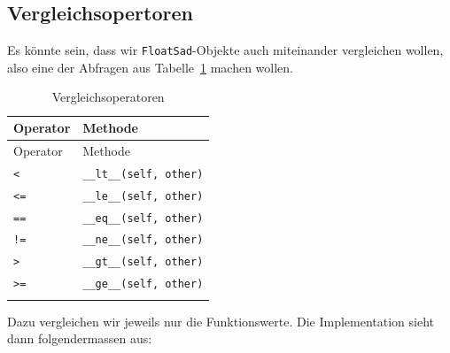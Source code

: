 \documentclass[
  letterpaper,
  DIV=11,
  oneside]{scrreprt}
\theoremstyle{definition}
\theoremstyle{definition}
\theoremstyle{remark}
\begin{document}
\hypertarget{vergleichsopertoren}{%
\subsection{Vergleichsopertoren}\label{vergleichsopertoren}}

Es könnte sein, dass wir \texttt{FloatSad}-Objekte auch miteinander
vergleichen wollen, also eine der Abfragen aus
Tabelle~\ref{tbl-Vergleichsmethoden} machen wollen.

\hypertarget{tbl-Vergleichsmethoden}{}
\begin{longtable}[]{@{}ll@{}}
\toprule()
Operator & Methode \\
\midrule()
\endfirsthead
\toprule()
Operator & Methode \\
\midrule()
\endhead
\texttt{\textless{}} & \texttt{\_\_lt\_\_(self,\ other)} \\
\texttt{\textless{}=} & \texttt{\_\_le\_\_(self,\ other)} \\
\texttt{==} & \texttt{\_\_eq\_\_(self,\ other)} \\
\texttt{!=} & \texttt{\_\_ne\_\_(self,\ other)} \\
\texttt{\textgreater{}} & \texttt{\_\_gt\_\_(self,\ other)} \\
\texttt{\textgreater{}=} & \texttt{\_\_ge\_\_(self,\ other)} \\
\bottomrule()
\caption{\label{tbl-Vergleichsmethoden}Vergleichsoperatoren}\tabularnewline
\end{longtable}

Dazu vergleichen wir jeweils nur die Funktionswerte. Die Implementation
sieht dann folgendermassen aus:
\end{document}
